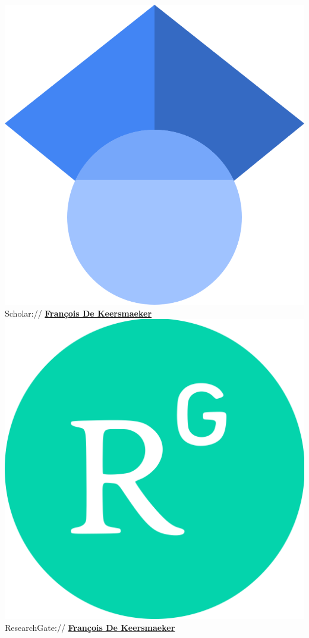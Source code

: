 \documentclass[]{deedy-resume-openfont}
\begin{document}
\begin{minipage}[t]{0.35\textwidth}
\includegraphics[scale=0.016]{images/scholar.png} Scholar:// \href{https://scholar.google.com/citations?user=UrEkeo4AAAAJ&hl=fr}{\bf François De Keersmaeker} \\
\includegraphics[scale=0.01]{images/researchgate.png} ResearchGate:// \href{https://www.researchgate.net/profile/Francois-De-Keersmaeker}{\bf François De Keersmaeker} \\

\end{minipage}
\end{document}
